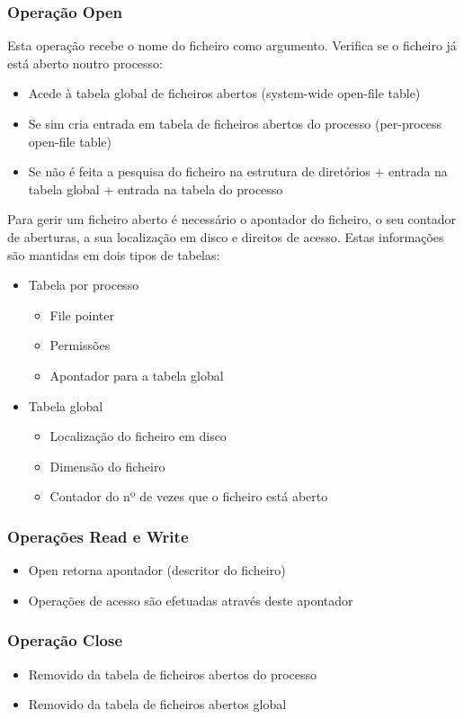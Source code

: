 \documentclass[10pt,a4paper]{report}
\begin{document}
\subsubsection{Operação Open}
Esta operação recebe o nome do ficheiro como argumento. Verifica se o ficheiro já está aberto noutro processo:
\begin{itemize}
\item Acede à tabela global de ficheiros abertos (system-wide open-file table)
\item Se sim cria entrada em tabela de ficheiros abertos do processo (per-process open-file table)
\item Se não é feita a pesquisa do ficheiro na estrutura de diretórios + entrada na tabela global + entrada na tabela do processo
\end{itemize}
Para gerir um ficheiro aberto é necessário o apontador do ficheiro, o seu contador de aberturas, a sua localização em disco e direitos de acesso. Estas informações são mantidas em dois tipos de tabelas:
\begin{itemize}
\item Tabela por processo
\begin{itemize}
\item File pointer
\item Permissões
\item Apontador para a tabela global
\end{itemize}
\item Tabela global
\begin{itemize}
\item Localização do ficheiro em disco
\item Dimensão do ficheiro
\item Contador do nº de vezes que o ficheiro está aberto
\end{itemize}
\end{itemize}
\subsubsection{Operações Read e Write}
\begin{itemize}
\item Open retorna apontador (descritor do ficheiro)
\item Operações de acesso são efetuadas através deste apontador
\end{itemize}
\subsubsection{Operação Close}
\begin{itemize}
\item Removido da tabela de ficheiros abertos do processo
\item Removido da tabela de ficheiros abertos global
\end{itemize}
\end{document}
